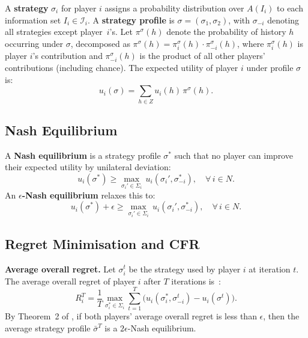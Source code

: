 \documentclass[sigconf]{aamas}
\begin{document}
A \textbf{strategy} $\sigma_i$ for player $i$ assigns a probability distribution over $A(I_i)$ to each information set $I_i \in \mathcal{I}_i$. A \textbf{strategy profile} is $\sigma = (\sigma_1, \sigma_2)$, with $\sigma_{-i}$ denoting all strategies except player~$i$'s. Let $\pi^{\sigma}(h)$ denote the probability of history $h$ occurring under $\sigma$, decomposed as $\pi^{\sigma}(h) = \pi_i^{\sigma}(h) \cdot \pi_{-i}^{\sigma}(h)$, where $\pi_i^{\sigma}(h)$ is player $i$'s contribution and $\pi_{-i}^{\sigma}(h)$ is the product of all other players' contributions (including chance). The expected utility of player $i$ under profile $\sigma$ is:
\begin{equation}
    u_i(\sigma) = \sum_{h \in Z} u_i(h) \, \pi^{\sigma}(h).
    \label{eq:expected_utility}
\end{equation}

\subsection{Nash Equilibrium}
\label{sec:nash}

A \textbf{Nash equilibrium} is a strategy profile $\sigma^*$ such that no player can improve their expected utility by unilateral deviation:
\begin{equation}
    u_i(\sigma^*) \geq \max_{\sigma_i' \in \Sigma_i} \, u_i(\sigma_i', \sigma_{-i}^*), \quad \forall \, i \in N.
    \label{eq:nash}
\end{equation}
An \textbf{$\epsilon$-Nash equilibrium} relaxes this to:
\begin{equation}
    u_i(\sigma^*) + \epsilon \geq \max_{\sigma_i' \in \Sigma_i} \, u_i(\sigma_i', \sigma_{-i}^*), \quad \forall \, i \in N.
    \label{eq:eps_nash}
\end{equation}

\subsection{Regret Minimisation and CFR}
\label{sec:cfr}

\textbf{Average overall regret.}\quad
Let $\sigma_i^t$ be the strategy used by player $i$ at iteration $t$. The average overall regret of player $i$ after $T$ iterations is~\cite{Zinkevich2007}:
\begin{equation}
    R_i^T = \frac{1}{T} \max_{\sigma_i^* \in \Sigma_i} \sum_{t=1}^{T} \Big( u_i(\sigma_i^*, \sigma_{-i}^t) - u_i(\sigma^t) \Big).
    \label{eq:overall_regret}
\end{equation}
By Theorem~2 of \cite{Zinkevich2007}, if both players' average overall regret is less than $\epsilon$, then the average strategy profile $\bar{\sigma}^T$ is a $2\epsilon$-Nash equilibrium.
\end{document}
